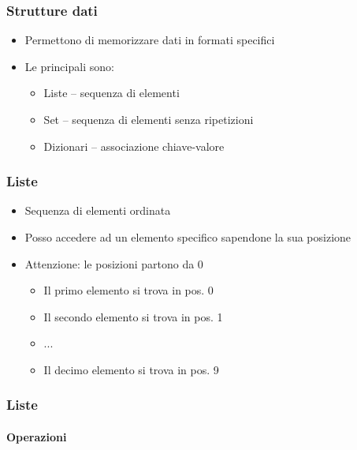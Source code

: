 
\begin{contentframe}
    \frametitle{Strutture dati}

    \begin{itemize}
        \item Permettono di memorizzare dati in formati specifici

        \bigskip
        \item Le principali sono:
        \begin{itemize}
            \item Liste -- sequenza di elementi
            \item Set -- sequenza di elementi senza ripetizioni
            \item Dizionari -- associazione chiave-valore
        \end{itemize}
    \end{itemize}
\end{contentframe}

\begin{contentframe}
    \frametitle{Liste}

    \begin{itemize}
        \item Sequenza di elementi ordinata

        \bigskip
        \item Posso accedere ad un elemento specifico sapendone la sua posizione
        \item Attenzione: le posizioni partono da 0
        \begin{itemize}
            \item Il primo elemento si trova in pos. 0
            \item Il secondo elemento si trova in pos. 1
            \item ...
            \item Il decimo elemento si trova in pos. 9
        \end{itemize}
    \end{itemize}
\end{contentframe}

\begin{contentframe}
    \frametitle{Liste}
    \framesubtitle{Operazioni}

\end{contentframe}

